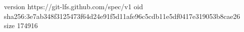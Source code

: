 version https://git-lfs.github.com/spec/v1
oid sha256:3e7ab348f3125473f64d24e91f5d11afe96c5cdb11e5df0417e319053b8cae26
size 174916
